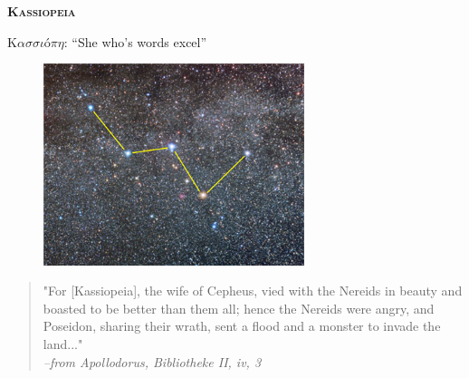 
\begin{center}

\vspace{2cm}
{\Huge {\bf \textsc{Kassiopeia}}}
\vspace{2cm}

{\Large K$\alpha\sigma\sigma\iota$\'o$\pi\eta$: ``She who's words excel''}
\vspace{1cm}

\begin{figure}[ht]
\begin{center}
\includegraphics[width=3in]{images/Cassiopeia.png}
\end{center}
\end{figure}
\vspace{1cm}

\begin{quotation}
"For [Kassiopeia], the wife of Cepheus, vied with the Nereids in beauty and boasted to be better than them all; hence the Nereids were angry, and Poseidon, sharing their wrath, sent a flood and a monster to invade the land..."\\

{\it --from Apollodorus, Bibliotheke II, iv, 3}
\end{quotation}
\end{center}

